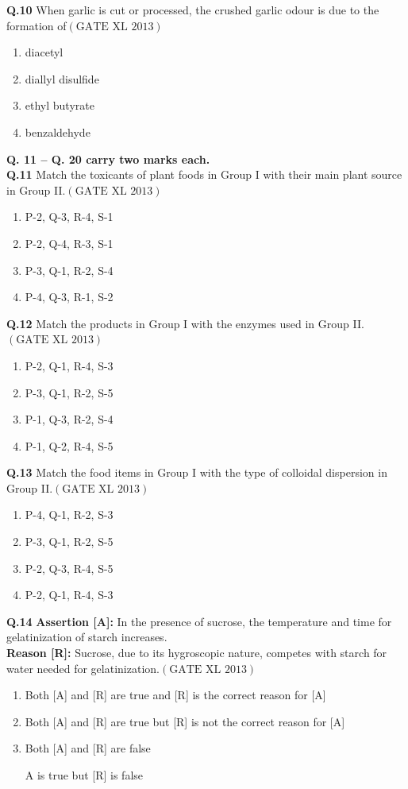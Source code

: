 \documentclass[12pt]{article}
\theoremstyle{remark}
\providecommand{\brak}[1]{\ensuremath{\left(#1\right)}}
\begin{document}
\textbf{Q.10} When garlic is cut or processed, the crushed garlic odour is due to the formation of\hfill $\brak{\text{GATE XL 2013}}$
\begin{enumerate}
    \item diacetyl
    \item diallyl disulfide
    \item ethyl butyrate
    \item benzaldehyde
\end{enumerate}

\noindent\textbf{Q. 11 – Q. 20 carry two marks each.}\\

\textbf{Q.11} Match the toxicants of plant foods in Group I with their main plant source in Group II.\hfill $\brak{\text{GATE XL 2013}}$
\begin{enumerate}
    \item P-2, Q-3, R-4, S-1
    \item P-2, Q-4, R-3, S-1
    \item P-3, Q-1, R-2, S-4
    \item P-4, Q-3, R-1, S-2
\end{enumerate}

\textbf{Q.12} Match the products in Group I with the enzymes used in Group II.\hfill $\brak{\text{GATE XL 2013}}$
\begin{enumerate}
    \item P-2, Q-1, R-4, S-3
    \item P-3, Q-1, R-2, S-5
    \item P-1, Q-3, R-2, S-4
    \item P-1, Q-2, R-4, S-5
\end{enumerate}

\textbf{Q.13} Match the food items in Group I with the type of colloidal dispersion in Group II.\hfill $\brak{\text{GATE XL 2013}}$
\begin{enumerate}
    \item P-4, Q-1, R-2, S-3
    \item P-3, Q-1, R-2, S-5
    \item P-2, Q-3, R-4, S-5
    \item P-2, Q-1, R-4, S-3
\end{enumerate}

\textbf{Q.14} 
\textbf{Assertion [A]:} In the presence of sucrose, the temperature and time for gelatinization of starch increases.\\
\textbf{Reason [R]:} Sucrose, due to its hygroscopic nature, competes with starch for water needed for gelatinization.\hfill $\brak{\text{GATE XL 2013}}$
\begin{enumerate}
    \item Both [A] and [R] are true and [R] is the correct reason for [A]
    \item Both [A] and [R] are true but [R] is not the correct reason for [A]
    \item Both [A] and [R] are false
    \item [A] is true but [R] is false
\end{enumerate}
\end{document}
